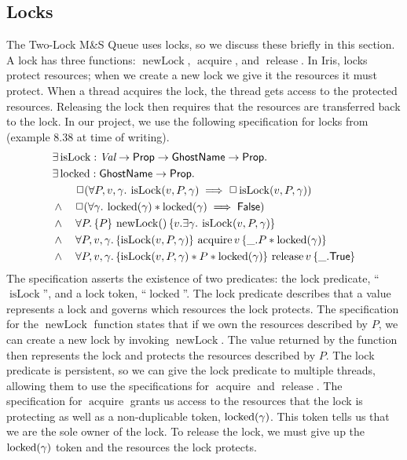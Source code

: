 \documentclass[a4paper, 10pt]{report}
\theoremstyle{definition}
\newcommand{\isLock}{\operatorname{isLock}}
\newcommand{\locked}{\operatorname{locked}}
\newcommand{\newLock}{\operatorname{newLock}}
\newcommand{\acquire}{\operatorname{acquire}}
\newcommand{\release}{\operatorname{release}}
\newcommand{\msq}{M\&S Queue}
\newcommand{\tlmsq}{Two-Lock \msq{}}
\begin{document}
\subsection{Locks}\label{Pre:iris:locks}
The \tlmsq{} uses locks, so we discuss these briefly in this section. A lock has three functions: $\newLock$, $\acquire$, and $\release$. In Iris, locks protect resources; when we create a new lock we give it the resources it must protect. When a thread acquires the lock, the thread gets access to the protected resources. Releasing the lock then requires that the resources are transferred back to the lock. In our project, we use the following specification for locks from \citet{gentleiris} (example 8.38 at time of writing).
\begin{align*}
  &\Exists \isLock : \Val \to \Prop \to \textlog{GhostName} \to \Prop.\nonumber\\
  &\Exists \locked : \textlog{GhostName} \to \Prop.\nonumber\\
  &\quad\quad\persistently(\All P, v, \gamma. \isLock(v,P,\gamma) \implies \persistently \isLock(v,P,\gamma))\\
  &\land\quad\persistently(\All \gamma. \locked(\gamma) \ast \locked(\gamma) \implies \FALSE)\\
  &\land\quad\All P.\hoare{P}{\newLock ()}{v.\Exists \gamma.\isLock(v,P,\gamma)}\\
  &\land\quad\All P, v, \gamma.\hoare{\isLock(v,P,\gamma)}{\acquire v}{\_.P \ast \locked(\gamma)}\\
  &\land\quad\All P, v, \gamma.\hoare{\isLock(v,P,\gamma) \ast P \ast \locked(\gamma)}{\release v}{\_.\TRUE}
\end{align*}
The specification asserts the existence of two predicates: the lock predicate, ``$\isLock$'', and a lock token, ``$\locked$''. The lock predicate describes that a value represents a lock and governs which resources the lock protects. The specification for the $\newLock$ function states that if we own the resources described by $P$, we can create a new lock by invoking $\newLock$. The value returned by the function then represents the lock and protects the resources described by $P$. The lock predicate is persistent, so we can give the lock predicate to multiple threads, allowing them to use the specifications for $\acquire$ and $\release$. The specification for $\acquire$ grants us access to the resources that the lock is protecting as well as a non-duplicable token, $\locked(\gname)$. This token tells us that we are the sole owner of the lock. To release the lock, we must give up the $\locked(\gname)$ token and the resources the lock protects.
\end{document}

